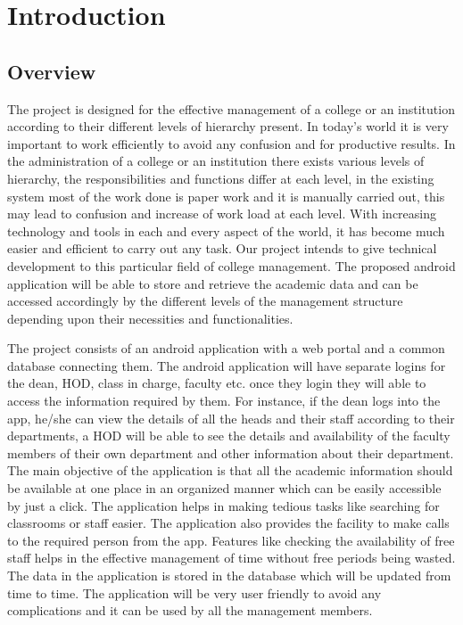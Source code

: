 \documentclass[BTech]{srmuthesis}
\begin{document}
\pagebreak




\chapter{Introduction}
\section{Overview}
The project is designed for the effective management of a college or an institution
according to their different levels of hierarchy present. In today's world it is very
important to work efficiently to avoid any confusion and for productive results. In the
administration of a college or an institution there exists various levels of hierarchy, the
responsibilities and functions differ at each level, in the existing system most of the work
done is paper work and it is manually carried out, this may lead to confusion and increase
of work load at each level. With increasing technology and tools in each and every aspect
of the world, it has become much easier and efficient to carry out any task. Our project
intends to give technical development to this particular field of college management. The
proposed android application will be able to store and retrieve the academic data and can
be accessed accordingly by the different levels of the management structure depending
upon their necessities and functionalities.

The project consists of an android application with a web portal and a common
database connecting them. The android application will have separate logins for the dean,
HOD, class in charge, faculty etc. once they login they will able to access the information required by them. For instance, if the dean logs into the app, he/she can view the details of all the heads and their staff according to their departments, a HOD will be able to see the details and availability of the faculty members of their own department and other information about their department. The main objective of the application is that all the academic information should be available at one place in an organized manner which can be easily accessible by just a click. The application helps in making tedious tasks like searching for classrooms or staff easier. The application also provides the facility to make calls to the required person from the app. Features like checking the availability of free staff helps in the effective management of time without free periods being wasted. The data in the application is stored in the database which will be updated from time to time. The application will be very user friendly to avoid any complications and it can be used by all the management members.
\end{document}
